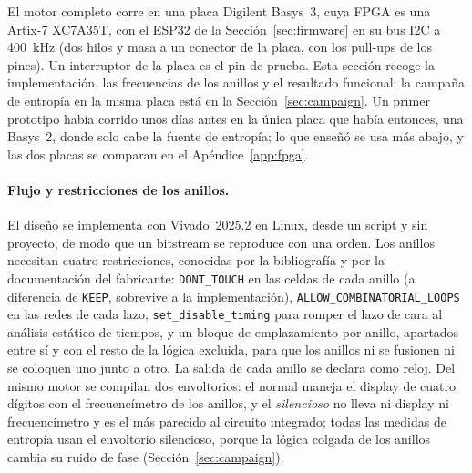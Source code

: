 El motor completo corre en una placa Digilent Basys~3, cuya \ac{FPGA} es
una Artix-7 XC7A35T, con el ESP32 de la Sección~\ref{sec:firmware} en su
bus \ac{I2C} a 400~kHz (dos hilos y masa a un conector de la placa, con
los pull-ups de los pines). Un interruptor de la placa es el pin de
prueba. Esta sección recoge la implementación, las frecuencias de los
anillos y el resultado funcional; la campaña de entropía en la misma
placa está en la Sección~\ref{sec:campaign}. Un primer prototipo había
corrido unos días antes en la única placa que había entonces, una
Basys~2, donde solo cabe la fuente de entropía; lo que enseñó se usa más
abajo, y las dos placas se comparan en el Apéndice~\ref{app:fpga}.

\paragraph{Flujo y restricciones de los anillos.} El diseño se
implementa con Vivado~2025.2 en Linux, desde un script y sin proyecto,
de modo que un bitstream se reproduce con una orden. Los anillos
necesitan cuatro restricciones, conocidas por la bibliografía y por la
documentación del fabricante: \texttt{DONT\_TOUCH} en las celdas de cada
anillo (a diferencia de \texttt{KEEP}, sobrevive a la implementación),
\texttt{ALLOW\_COMBINATORIAL\_LOOPS} en las redes de cada lazo,
\texttt{set\_disable\_timing} para romper el lazo de cara al análisis
estático de tiempos, y un bloque de emplazamiento por anillo, apartados
entre sí y con el resto de la lógica excluida, para que los anillos ni
se fusionen ni se coloquen uno junto a otro. La salida de cada anillo se
declara como reloj. Del mismo motor se compilan dos envoltorios: el
normal maneja el display de cuatro dígitos con el frecuencímetro de los
anillos, y el \emph{silencioso} no lleva ni display ni frecuencímetro y
es el más parecido al circuito integrado; todas las medidas de entropía
usan el envoltorio silencioso, porque la lógica colgada de los anillos
cambia su ruido de fase (Sección~\ref{sec:campaign}).

